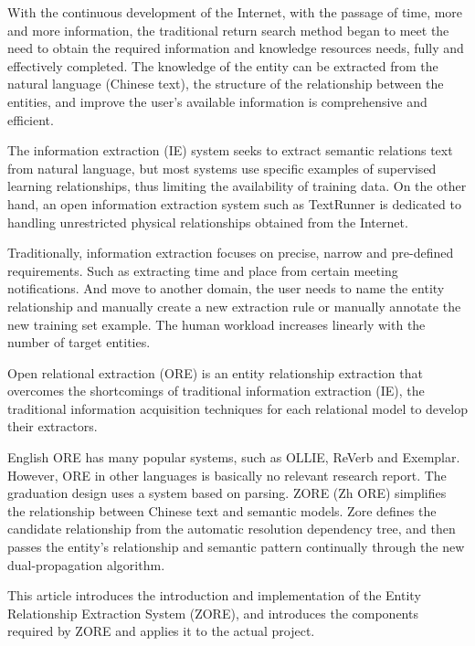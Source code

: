 \begin{enabstract}
With the continuous development of the Internet, with the passage of time, more and more information, the traditional return search method began to meet the need to obtain the required information and knowledge resources needs, fully and effectively completed. The knowledge of the entity can be extracted from the natural language (Chinese text), the structure of the relationship between the entities, and improve the user's available information is comprehensive and efficient.

The information extraction (IE) system seeks to extract semantic relations text from natural language, but most systems use specific examples of supervised learning relationships, thus limiting the availability of training data. On the other hand, an open information extraction system such as TextRunner is dedicated to handling unrestricted physical relationships obtained from the Internet.

Traditionally, information extraction focuses on precise, narrow and pre-defined requirements. Such as extracting time and place from certain meeting notifications. And move to another domain, the user needs to name the entity relationship and manually create a new extraction rule or manually annotate the new training set example. The human workload increases linearly with the number of target entities.

Open relational extraction (ORE) is an entity relationship extraction that overcomes the shortcomings of traditional information extraction (IE), the traditional information acquisition techniques for each relational model to develop their extractors.

English ORE has many popular systems, such as OLLIE, ReVerb and Exemplar. However, ORE in other languages ​​is basically no relevant research report. The graduation design uses a system based on parsing. ZORE (Zh ORE) simplifies the relationship between Chinese text and semantic models. Zore defines the candidate relationship from the automatic resolution dependency tree, and then passes the entity's relationship and semantic pattern continually through the new dual-propagation algorithm.

This article introduces the introduction and implementation of the Entity Relationship Extraction System (ZORE), and introduces the components required by ZORE and applies it to the actual project.

\end{enabstract}
